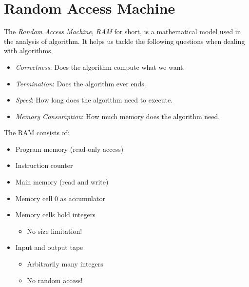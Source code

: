 
\section{Random Access Machine}

The \emph{Random Access Machine}, \emph{RAM} for short, is a mathematical model used in the analysis of algorithm. 
It helps us tackle the following questions when dealing with algorithms.

\begin{itemize}
   
    \item \emph{Correctness}: Does the algorithm compute what we want. 

    \item \emph{Termination}: Does the algorithm ever ends. 

    \item \emph{Speed}: How long does the algorithm need to execute.

    \item \emph{Memory Consumption}: How much memory does the algorithm need. 

\end{itemize}

The RAM consists of:

\begin{itemize}

    \item Program memory (read-only access)
    
    \item Instruction counter
    
    \item Main memory (read and write)
    
    \item Memory cell 0 as accumulator
    
    \item Memory cells hold integers
    
        \begin{itemize}
        
            \item No size limitation!
        
        \end{itemize}
        
    \item Input and output tape
    
        \begin{itemize}
        
            \item Arbitrarily many integers
            
            \item No random access!
        \end{itemize}

\end{itemize}

